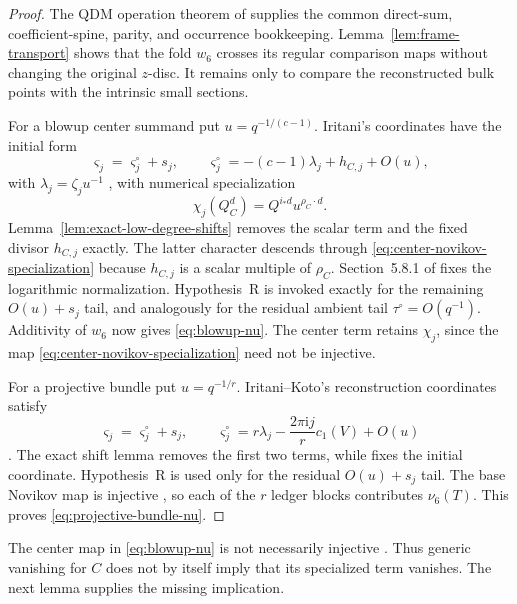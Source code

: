 \begin{proof}
The QDM operation theorem of \cite[Section~2]{RuddM1} supplies the common direct-sum,
coefficient-spine, parity, and occurrence bookkeeping.
Lemma~\ref{lem:frame-transport} shows that the fold \(w_6\) crosses its regular
comparison maps without changing the original \(z\)-disc.  It remains only to
compare the reconstructed bulk points with the intrinsic small sections.

For a blowup center summand put \(u=q^{-1/(c-1)}\).  Iritani's coordinates
have the initial form
\[
 \varsigma_j=\varsigma_j^\circ+s_j,
 \qquad
 \varsigma_j^\circ=-(c-1)\lambda_j+h_{C,j}+O(u),
 \label{eq:blowup-reconstruction-coordinate}
\]
with $\lambda_j=\zeta_j u^{-1}$
\cite[Section~5.8.2 and (5.27)--(5.30)]{IritaniBlowup}, with numerical
specialization
\begin{equation}
 \chi_j(Q_C^d)=Q^{i_*d}u^{\rho_C\cdot d}.
 \label{eq:center-novikov-specialization}
\end{equation}
Lemma~\ref{lem:exact-low-degree-shifts} removes the scalar term and the fixed
divisor \(h_{C,j}\) exactly.  The latter character descends through
\eqref{eq:center-novikov-specialization} because $h_{C,j}$ is a scalar
multiple of $\rho_C$.  Section~5.8.1 of \cite{IritaniBlowup} fixes the
logarithmic normalization.  Hypothesis~R is invoked exactly for the
remaining \(O(u)+s_j\) tail, and analogously for the residual ambient tail
\(\tau^\circ=O(q^{-1})\).  Additivity of \(w_6\) now gives
\eqref{eq:blowup-nu}.  The center term retains \(\chi_j\), since the map
\eqref{eq:center-novikov-specialization} need not be injective.

For a projective bundle put \(u=q^{-1/r}\).  Iritani--Koto's reconstruction
coordinates satisfy
\[
 \varsigma_j=\varsigma_j^\circ+s_j,
 \qquad
 \varsigma_j^\circ
 =r\lambda_j-\frac{2\pi\mathrm{i}j}{r}c_1(V)+O(u)
\]
\cite[Theorem~5.1(4), Proposition~5.6]{IritaniKoto}.  The exact shift lemma
removes the first two terms, while \cite[(5.11)--(5.12)]{IritaniKoto} fixes
the initial coordinate.  Hypothesis~R is used only for the residual
\(O(u)+s_j\) tail.  The base Novikov map is injective
\cite[(1.1) and Remark~5.2]{IritaniKoto}, so each of the \(r\) ledger blocks
contributes \(\nu_6(T)\).  This proves \eqref{eq:projective-bundle-nu}.
\end{proof}

The center map in \eqref{eq:blowup-nu} is not necessarily injective
\cite[(5.15)]{IritaniBlowup}.  Thus generic vanishing for \(C\) does not by
itself imply that its specialized term vanishes.  The next lemma supplies the
missing implication.

